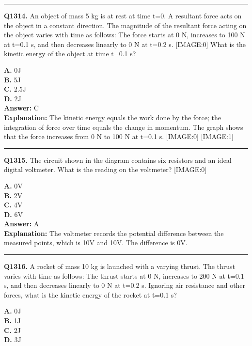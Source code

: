 \documentclass[12pt]{article}
\begin{document}
\hrule
\vspace{1em}


\noindent
\textbf{Q1314.} An object of mass 5 kg is at rest at time t=0. A resultant force acts on the object in a constant direction. The magnitude of the resultant force acting on the object varies with time as follows:
The force starts at 0 N, increases to 100 N at t=0.1 s, and then decreases linearly to 0 N at t=0.2 s.
[IMAGE:0]
What is the kinetic energy of the object at time t=0.1 s?



\textbf{A.} 0J \\
\textbf{B.} 5J \\
\textbf{C.} 2.5J \\
\textbf{D.} 2J \\

\textbf{Answer:} C \\
\textbf{Explanation:} The kinetic energy equals the work done by the force; the integration of force over time equals the change in momentum. The graph shows that the force increases from 0 N to 100 N at t=0.1 s.
[IMAGE:0]
[IMAGE:1]

\hrule
\vspace{1em}


\noindent
\textbf{Q1315.} The circuit shown in the diagram contains six resistors and an ideal digital voltmeter.
What is the reading on the voltmeter?
[IMAGE:0]



\textbf{A.} 0V \\
\textbf{B.} 2V \\
\textbf{C.} 4V \\
\textbf{D.} 6V \\

\textbf{Answer:} A \\
\textbf{Explanation:} The voltmeter records the potential difference between the measured points, which is 10V and 10V. The difference is 0V.

\hrule
\vspace{1em}


\noindent
\textbf{Q1316.} A rocket of mass 10 kg is launched with a varying thrust. The thrust varies with time as follows:
The thrust starts at 0 N, increases to 200 N at t=0.1 s, and then decreases linearly to 0 N at t=0.2 s.
Ignoring air resistance and other forces, what is the kinetic energy of the rocket at t=0.1 s?



\textbf{A.} 0J \\
\textbf{B.} 1J \\
\textbf{C.} 2J \\
\textbf{D.} 3J \\
\end{document}
